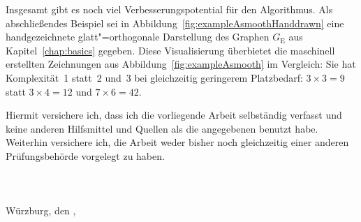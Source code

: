 \documentclass[a4paper]{scrreprt}
\theoremstyle{definition}
\begin{document}
Insgesamt gibt es noch viel Verbesserungspotential für den Algorithmus. Als abschließendes Beispiel sei in Abbildung~\ref{fig:exampleAsmoothHanddrawn} eine handgezeichnete glatt"=orthogonale Darstellung des Graphen $G_\text{E}$ aus Kapitel~\ref{chap:basics} gegeben. Diese Visualisierung überbietet die maschinell erstellten Zeichnungen aus Abbildung~\ref{fig:exampleAsmooth} im Vergleich: Sie hat Komplexität~1 statt~2 und~3 bei gleichzeitig geringerem Platzbedarf: $3 \times 3 = 9$ statt $3 \times 4 = 12$ und $7 \times 6 = 42$.






\newpage

Hiermit versichere ich, dass ich die vorliegende Arbeit selbständig verfasst und keine
anderen Hilfsmittel und Quellen als die angegebenen benutzt habe. Weiterhin versichere
ich, die Arbeit weder bisher noch gleichzeitig einer anderen Prüfungsbehörde vorgelegt
zu haben.
\\ \\ \\ \\
Würzburg, den \makebox[3cm]{\hrulefill},  \hspace{.5cm} \makebox[7cm]{\hrulefill}\\
\end{document}
